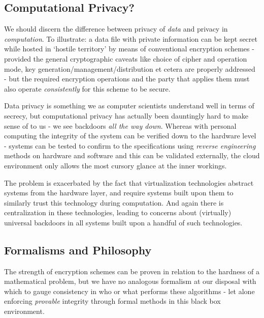 \documentclass[12pt]{article}
\begin{document}
\subsection{Computational Privacy?}
We should discern the difference between privacy of \textit{data} and privacy in \textit{computation}.
To illustrate: a data file with private information can be kept secret while hosted in `hostile territory' by means of conventional encryption schemes - provided the general cryptographic caveats like choice of cipher and operation mode, key generation/management/distribution et cetera are properly addressed - but the required encryption operations and the party that applies them must also operate \textit{consistently} for this scheme to be secure.

Data privacy is something we as computer scientists understand well in terms of secrecy, but computational privacy has actually been dauntingly hard to make sense of to us - we see backdoors \emph{all the way down}.
Whereas with personal computing the integrity of the system can be verified down to the hardware level - systems can be tested to confirm to the specifications using \textit{reverse engineering} methods on hardware and software and this can be validated externally, the cloud environment only allows the most cursory glance at the inner workings.

The problem is exacerbated by the fact that virtualization technologies abstract systems from the hardware layer, and require systems built upon them to similarly trust this technology during computation.
And again there is centralization in these technologies, leading to concerns about (virtually) universal backdoors in all systems built upon a handful of such technologies.

\subsection{Formalisms and Philosophy}
The strength of encryption schemes can be proven in relation to the hardness of a mathematical problem, but we have no analogous formalism at our disposal with which to gauge consistency in who or what performs these algorithms - let alone enforcing \textit{provable} integrity through formal methods in this black box environment.
\end{document}
